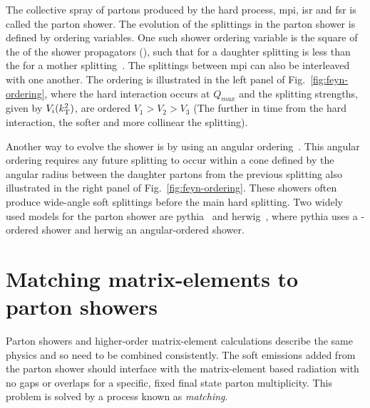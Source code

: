 The collective spray of partons produced by the hard process, \acrshort{mpi}, \acrshort{isr} and \acrshort{fsr} is called the parton shower.
The evolution of the splittings in the parton shower is defined by ordering variables.
One such shower ordering variable is the square of the \pt{} of the shower propagators (\ktsq{}), such that \ktsq{} for a daughter splitting is less than the \ktsq{} for a mother splitting~\cite{Gen:kt}.
The splittings between \acrshort{mpi} can also be interleaved with one another.
The \ktsq{} ordering is illustrated in the left panel of Fig.~\ref{fig:feyn-ordering}, where the hard interaction occurs at $Q_{max}$ and the splitting strengths, given by $V_{i}(k_{\mathrm{T}}^2{})$, are ordered $V_{1} > V_{2} > V_{3}$ (The further in time from the hard interaction, the softer and more collinear the splitting). 

Another way to evolve the shower is by using an angular ordering~\cite{Gen:angular}.
This angular ordering requires any future splitting to occur within a cone defined by the angular radius between the daughter partons from the previous splitting also illustrated in the right panel of Fig.~\ref{fig:feyn-ordering}.
These showers often produce wide-angle soft splittings before the main hard splitting.
Two widely used models for the parton shower are \acrshort{pythia}~\cite{Gen:Pyth8p2} and \acrshort{herwig}~\cite{Gen:Herwigpp}, where \acrshort{pythia} uses a \ktsq{}-ordered shower and \acrshort{herwig} an angular-ordered shower.




\section{Matching matrix-elements to parton showers} %
\label{sec:matching_matrix_elements_to_parton_showers}

Parton showers and higher-order matrix-element calculations describe the same physics and so need to be combined consistently.
The soft emissions added from the parton shower should interface with the matrix-element based radiation with no gaps or overlaps for a specific, fixed final state parton multiplicity.
This problem is solved by a process known as \textit{matching}.

